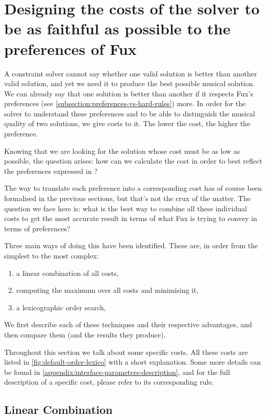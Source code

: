 \section{Designing the costs of the solver to be as faithful as possible to the preferences of Fux} \label{costs}
A constraint solver cannot say whether one valid solution is better than another valid solution, and yet we need it to produce the best possible musical solution. We can already say that one solution is better than another if it respects Fux's preferences (see \ref{subsection:preferences-vs-hard-rules}) more. In order for the solver to understand these preferences and to be able to distinguish the musical quality of two solutions, we give costs to it.  The lower the cost, the higher the preference.

Knowing that we are looking for the solution whose cost must be as low as possible, the question arises: how can we calculate the cost in order to best reflect the preferences expressed in \gap?

The way to translate each preference into a corresponding cost has of course been formalised in the previous sections, but that's not the crux of the matter. The question we face here is: what is the best way to combine all these individual costs to get the most accurate result in terms of what Fux is trying to convey in terms of preferences?

Three main ways of doing this have been identified. These are, in order from the simplest to the most complex:
\begin{enumerate}
    \item a linear combination of all costs,
    \item computing the maximum over all costs and minimising it,
    \item a lexicographic order search, 
\end{enumerate}
We first describe each of these techniques and their respective advantages, and then compare them (and the results they produce).

Throughout this section we talk about some specific costs. All these costs are listed in \ref{fig:default-order-lexico} with a short explanation. Some more details can be found in \ref{appendix:interface-parameters-description}, and for the full description of a specific cost, please refer to its corresponding rule. 


\subsection{Linear Combination}


